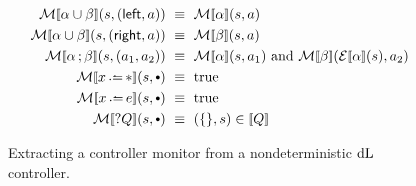 \documentclass[acmsmall,screen,nonacm]{acmart}
\begin{document}
\begin{figure}
  \begin{align*}
  \CtrlMonitorSem{\alpha \cup \beta}(s, \SumLeftInj{a}) & \ \equiv \ \CtrlMonitorSem{\alpha}(s, a) \\
  \CtrlMonitorSem{\alpha \cup \beta}(s, \SumRightInj{a}) & \ \equiv \ \CtrlMonitorSem{\beta}(s, a) \\
  \CtrlMonitorSem{\alpha \seqI \beta}(s, (a_1, a_2)) & \ \equiv \ \BoolAnd{\CtrlMonitorSem{\alpha}(s, a_1)}{\CtrlMonitorSem{\beta}(\CtrlExeSem{\alpha}(s), a_2)} \\
  \CtrlMonitorSem{x \dlassign *}(s, \Unit) & \ \equiv \ \BoolTrue \\
  \CtrlMonitorSem{x \dlassign e}(s, \Unit) & \ \equiv \ \BoolTrue \\
  \CtrlMonitorSem{?Q}(s, \Unit) & \ \equiv \ (\EmptyValuation, s) \in \sem{Q}
  \end{align*}
  \caption{Extracting a controller monitor from a nondeterministic $\mathop{}\!\mathrm{d} \text{L}$ controller.}
  \label{fig:deriving-cm}
\end{figure}
\end{document}
